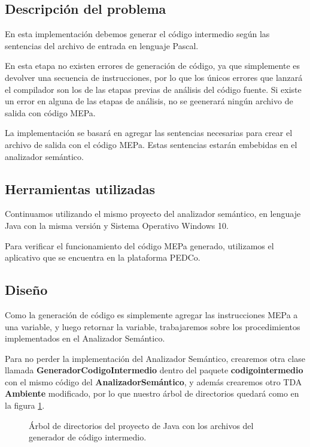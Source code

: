 \subsection{Descripción del problema}
En esta implementación debemos generar el código intermedio según las sentencias del archivo de entrada en lenguaje Pascal. 

En esta etapa no existen errores de generación de código, ya que simplemente es devolver una secuencia de instrucciones, por lo que los únicos errores que lanzará el compilador son los de las etapas previas de análisis del código fuente. Si existe un error en alguna de las etapas de análisis, no se geenerará ningún archivo de salida con código MEPa.

La implementación se basará en agregar las sentencias necesarias para crear el archivo de salida con el código MEPa. Estas sentencias estarán embebidas en el analizador semántico.

\subsection{Herramientas utilizadas}
Continuamos utilizando el mismo proyecto del analizador semántico, en lenguaje Java con la misma versión y Sistema Operativo Windows 10.

Para verificar el funcionamiento del código MEPa generado, utilizamos el aplicativo que se encuentra en la plataforma PEDCo.

\subsection{Diseño}
Como la generación de código es simplemente agregar las instrucciones MEPa a una variable, y luego retornar la variable, trabajaremos sobre los procedimientos implementados en el Analizador Semántico. 

Para no perder la implementación del Analizador Semántico, crearemos otra clase llamada \textbf{GeneradorCodigoIntermedio} dentro del paquete \textbf{codigointermedio} con el mismo código del \textbf{AnalizadorSemántico}, y además crearemos otro TDA \textbf{Ambiente} modificado, por lo que nuestro árbol de directorios quedará como en la figura \ref{fig:arbol_dir_5}.

\begin{figure}[H]
\caption{Árbol de directorios del proyecto de Java con los archivos del generador de código intermedio.}
\label{fig:arbol_dir_5}
\end{figure}

